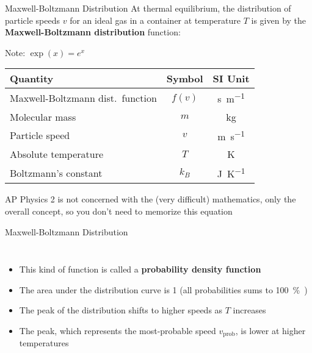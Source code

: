 \documentclass[12pt,aspectratio=169,dvipsnames]{beamer}
\begin{document}
\begin{frame}{Maxwell-Boltzmann Distribution}
  At thermal equilibrium, the distribution of particle speeds $v$ for an ideal
  gas in a container at temperature $T$ is given by the
  \textbf{Maxwell-Boltzmann distribution} function:

  Note: $\exp(x)=e^x$
  \begin{center}
    \begin{tabular}{l|c|c}
      \rowcolor{pink}
      \textbf{Quantity} & \textbf{Symbol} & \textbf{SI Unit} \\ \hline
      Maxwell-Boltzmann dist.\ function & $f(v)$ &\si{\second\per\metre}\\
      Molecular mass       & $m$   & \si{\kilo\gram} \\
      Particle speed       & $v$   & \si{\metre\per\second} \\
      Absolute temperature & $T$   & \si\kelvin \\
      Boltzmann's constant & $k_B$ & \si{\joule\per\kelvin}
    \end{tabular}
  \end{center}
  AP Physics 2 is not concerned with the (very difficult) mathematics, only
  the overall concept, so you don't need to memorize this equation
\end{frame}



\begin{frame}{Maxwell-Boltzmann Distribution}
  \vspace{.15in}
  \begin{columns}
    
    \begin{itemize}
    \item This kind of function is called a \textbf{probability density
      function}
    \item The area under the distribution curve is 1 (all probabilities sums to
      \SI{100}\percent)
    \item The peak of the distribution shifts to higher speeds as $T$ increases
    \item The peak, which represents the most-probable speed $v_\text{prob}$,
      is lower at higher temperatures
    \end{itemize}
  \end{columns}
\end{frame}
\end{document}

